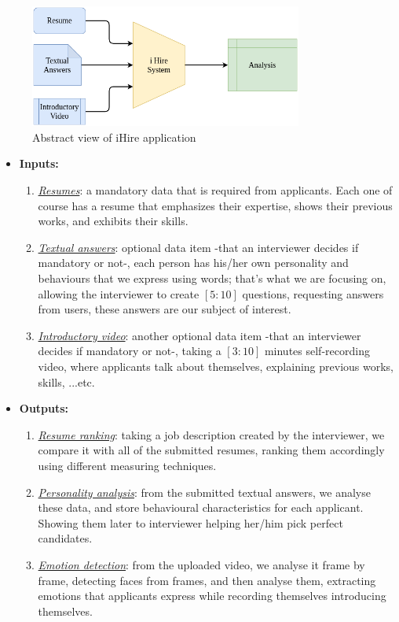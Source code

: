 \begin{figure}[h]
\centering
\includegraphics[width=0.8\textwidth]{images/sys_1.png}
\caption{Abstract view of iHire application}
\label{fig:sys_1}
\end{figure}

\begin{itemize}
    \item \textbf{Inputs:}
    \begin{enumerate}
        \item \emph{\underline{Resumes}}: a mandatory data that is required from applicants. Each one of course has a resume that emphasizes their expertise, shows their previous works, and exhibits their skills.
        \item \emph{\underline{Textual answers}}: optional data item -that an interviewer decides if mandatory or not-, each person has his/her own personality and behaviours that we express using words; that's what we are focusing on, allowing the interviewer to create $[5:10]$ questions, requesting answers from users, these answers are our subject of interest.
        \item \emph{\underline{Introductory video}}: another optional data item  -that an interviewer decides if mandatory or not-, taking a $[3:10]$ minutes self-recording video, where applicants talk about themselves, explaining previous works, skills, ...etc.
    \end{enumerate}
    \item \textbf{Outputs:}
    \begin{enumerate}
        \item \emph{\underline{Resume ranking}}: taking a job description created by the interviewer, we compare it with all of the submitted resumes, ranking them accordingly using different measuring techniques.
        
        \item \emph{\underline{Personality analysis}}: from the submitted textual answers, we analyse these data, and store behavioural characteristics for each applicant. Showing them later to interviewer helping her/him pick perfect candidates.
        
        \item \emph{\underline{Emotion detection}}: from the uploaded video, we analyse it frame by frame, detecting faces from frames, and then analyse them, extracting emotions that applicants express while recording themselves introducing themselves.
    \end{enumerate}
\end{itemize}



